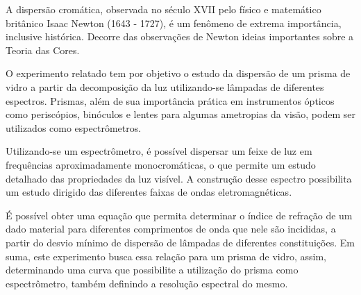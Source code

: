 A dispersão cromática, observada no século XVII pelo físico e matemático britânico Isaac Newton (1643 - 1727), é um fenômeno de extrema importância, inclusive histórica. Decorre das observações de Newton ideias importantes sobre a Teoria das Cores. 

O experimento relatado tem por objetivo o estudo da dispersão de um prisma de vidro a partir da decomposição da luz utilizando-se lâmpadas de diferentes espectros. Prismas, além de sua importância prática em instrumentos ópticos como periscópios, binóculos e lentes para algumas ametropias da visão, podem ser utilizados como espectrômetros. 

Utilizando-se um espectrômetro, é possível dispersar um feixe de luz em frequências aproximadamente monocromáticas, o que permite um estudo detalhado das propriedades da luz visível. A construção desse espectro possibilita um estudo dirigido das diferentes faixas de ondas eletromagnéticas.
     
É possível obter uma equação que permita determinar o índice de refração de um dado material para diferentes comprimentos de onda que nele são incididas, a partir do desvio mínimo de dispersão de lâmpadas de diferentes constituições. Em suma, este experimento busca essa relação para um prisma de vidro, assim, determinando uma curva que possibilite a utilização do prisma como espectrômetro, também definindo a resolução espectral do mesmo.
